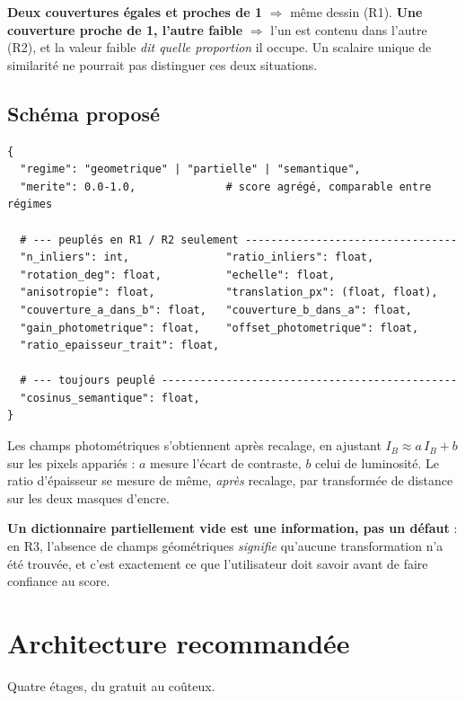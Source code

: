 \documentclass[11pt,a4paper]{article}
\newcommand{\aretenir}[1]{%
  \par\medskip
  \noindent\colorbox{encadre}{%
    \begin{minipage}{\dimexpr\linewidth-2\fboxsep}
      \vspace{2pt}#1\vspace{2pt}
    \end{minipage}}%
  \par\medskip
}
\newcommand{\alerte}[1]{\textcolor{alerte}{\textbf{#1}}}
\begin{document}
\aretenir{\textbf{Deux couvertures égales et proches de 1} $\Rightarrow$ même
dessin (R1). \textbf{Une couverture proche de 1, l'autre faible} $\Rightarrow$
l'un est contenu dans l'autre (R2), et la valeur faible \emph{dit quelle
proportion} il occupe. Un scalaire unique de similarité ne pourrait pas
distinguer ces deux situations.}

\subsection{Schéma proposé}

\begin{verbatim}
{
  "regime": "geometrique" | "partielle" | "semantique",
  "merite": 0.0-1.0,              # score agrégé, comparable entre régimes

  # --- peuplés en R1 / R2 seulement ---------------------------------
  "n_inliers": int,               "ratio_inliers": float,
  "rotation_deg": float,          "echelle": float,
  "anisotropie": float,           "translation_px": (float, float),
  "couverture_a_dans_b": float,   "couverture_b_dans_a": float,
  "gain_photometrique": float,    "offset_photometrique": float,
  "ratio_epaisseur_trait": float,

  # --- toujours peuplé ----------------------------------------------
  "cosinus_semantique": float,
}
\end{verbatim}

Les champs photométriques s'obtiennent après recalage, en ajustant
$I_B \approx a\,I_B + b$ sur les pixels appariés : $a$ mesure l'écart de
contraste, $b$ celui de luminosité. Le ratio d'épaisseur se mesure de même,
\emph{après} recalage, par transformée de distance sur les deux masques d'encre.

\alerte{Un dictionnaire partiellement vide est une information, pas un défaut} :
en R3, l'absence de champs géométriques \emph{signifie} qu'aucune transformation
n'a été trouvée, et c'est exactement ce que l'utilisateur doit savoir avant de
faire confiance au score.

\section{Architecture recommandée}
\label{sec:archi}

Quatre étages, du gratuit au coûteux.
\end{document}
